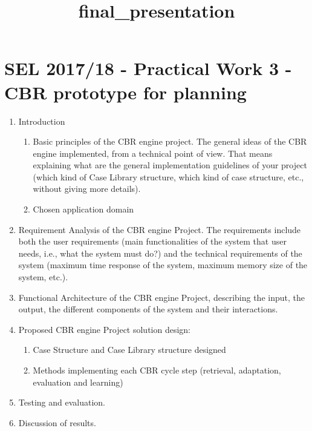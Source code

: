 \documentclass[11pt]{article}
\title{final\_presentation}
\providecommand{\tightlist}{%
      \setlength{\itemsep}{0pt}\setlength{\parskip}{0pt}}
\begin{document}
    
    
    \maketitle
    
    

    
    \section{SEL 2017/18 - Practical Work 3 - CBR prototype for
planning}\label{sel-201718---practical-work-3---cbr-prototype-for-planning}

\begin{enumerate}
\def\labelenumi{\arabic{enumi}.}
\item
  Introduction

  \begin{enumerate}
  \def\labelenumii{\arabic{enumii}.}
  \tightlist
  \item
    Basic principles of the CBR engine project. The general ideas of the
    CBR engine implemented, from a technical point of view. That means
    explaining what are the general implementation guidelines of your
    project (which kind of Case Library structure, which kind of case
    structure, etc., without giving more details).
  \item
    Chosen application domain
  \end{enumerate}
\item
  Requirement Analysis of the CBR engine Project. The requirements
  include both the user requirements (main functionalities of the system
  that user needs, i.e., what the system must do?) and the technical
  requirements of the system (maximum time response of the system,
  maximum memory size of the system, etc.).
\item
  Functional Architecture of the CBR engine Project, describing the
  input, the output, the different components of the system and their
  interactions.
\item
  Proposed CBR engine Project solution design:

  \begin{enumerate}
  \def\labelenumii{\arabic{enumii}.}
  \tightlist
  \item
    Case Structure and Case Library structure designed
  \item
    Methods implementing each CBR cycle step (retrieval, adaptation,
    evaluation and learning)
  \end{enumerate}
\item
  Testing and evaluation.
\item
  Discussion of results.
\end{enumerate}
\end{document}
